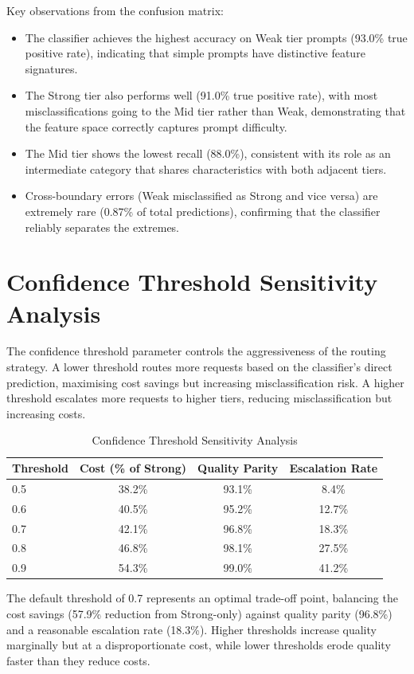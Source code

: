\documentclass[oneside,12pt,a4paper]{report}
\begin{document}
Key observations from the confusion matrix:
\begin{itemize}
  \item The classifier achieves the highest accuracy on Weak tier prompts (93.0\% true positive rate), indicating that simple prompts have distinctive feature signatures.
  \item The Strong tier also performs well (91.0\% true positive rate), with most misclassifications going to the Mid tier rather than Weak, demonstrating that the feature space correctly captures prompt difficulty.
  \item The Mid tier shows the lowest recall (88.0\%), consistent with its role as an intermediate category that shares characteristics with both adjacent tiers.
  \item Cross-boundary errors (Weak misclassified as Strong and vice versa) are extremely rare (0.87\% of total predictions), confirming that the classifier reliably separates the extremes.
\end{itemize}

\section{Confidence Threshold Sensitivity Analysis}

The confidence threshold parameter controls the aggressiveness of the routing strategy. A lower threshold routes more requests based on the classifier's direct prediction, maximising cost savings but increasing misclassification risk. A higher threshold escalates more requests to higher tiers, reducing misclassification but increasing costs.

\begin{table}[htbp]
  \centering
  \caption{Confidence Threshold Sensitivity Analysis}
  \label{tab:threshold_sensitivity}
  \begin{tabular}{lccc}
    \toprule
    \textbf{Threshold} & \textbf{Cost (\% of Strong)} & \textbf{Quality Parity} & \textbf{Escalation Rate} \\
    \midrule
    0.5 & 38.2\% & 93.1\% & 8.4\% \\
    0.6 & 40.5\% & 95.2\% & 12.7\% \\
    0.7 & 42.1\% & 96.8\% & 18.3\% \\
    0.8 & 46.8\% & 98.1\% & 27.5\% \\
    0.9 & 54.3\% & 99.0\% & 41.2\% \\
    \bottomrule
  \end{tabular}
\end{table}

The default threshold of 0.7 represents an optimal trade-off point, balancing the cost savings (57.9\% reduction from Strong-only) against quality parity (96.8\%) and a reasonable escalation rate (18.3\%). Higher thresholds increase quality marginally but at a disproportionate cost, while lower thresholds erode quality faster than they reduce costs.
\end{document}
